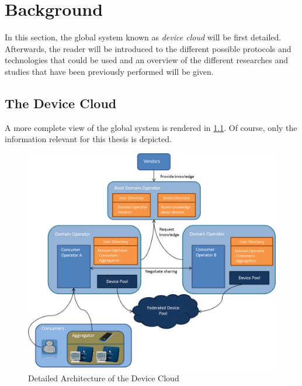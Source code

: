 \chapter{Background}
\label{cha:relatedwork}

In this section, the global system known as \emph{device cloud} will be first detailed. Afterwards, the reader will be introduced to the different possible protocols and technologies that could be used and an overview of the different researches and studies that have been previously performed will be given.
 
\section{The Device Cloud}
A more complete view of the global system is rendered in \ref{fig:design_complete}. Of course, only the information relevant for this thesis is depicted.


\begin{figure}[!ht]
	\centering
	\includegraphics[width=1\textwidth]{images/design_complete}
	\caption{Detailed Architecture of the Device Cloud}
	\label{fig:design_complete}
\end{figure}

